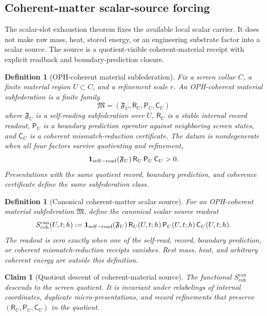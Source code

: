 \documentclass[11pt]{article}
\newtheorem{definition}[theorem]{Definition}
\newtheorem{claim}[theorem]{Claim}
\theoremstyle{remark}
\theoremstyle{plain}
\begin{document}
\subsection{Coherent-matter scalar-source forcing}
\label{sec:coherent-matter-scalar-source-forcing}

The scalar-slot exhaustion theorem fixes the available local scalar carrier.  It
does not make raw mass, heat, stored energy, or an engineering substrate factor
into a scalar source.  The source is a quotient-visible coherent-material receipt
with explicit readback and boundary-prediction closure.

\begin{definition}[OPH-coherent material subfederation]
\label{def:oph-coherent-material-subfederation}
Fix a screen collar \(C\), a finite material region \(U\subset C\), and a
refinement scale \(r\).  An OPH-coherent material subfederation is a finite
family
\[
  \mathfrak M=(\mathfrak F_U,\mathsf R_U,\mathsf P_U,\mathsf C_U)
\]
where \(\mathfrak F_U\) is a self-reading subfederation over \(U\),
\(\mathsf R_U\) is a stable internal record readout, \(\mathsf P_U\) is a
boundary prediction operator against neighboring screen states, and
\(\mathsf C_U\) is a coherent mismatch-reduction certificate.  The datum is
nondegenerate when all four factors survive quotienting and refinement,
\[
  \mathbf 1_{\rm self-read}(\mathfrak F_U)\,
  \mathsf R_U\,\mathsf P_U\,\mathsf C_U>0 .
\]
Presentations with the same quotient record, boundary prediction, and coherence
certificate define the same subfederation class.
\end{definition}

\begin{definition}[Canonical coherent-matter scalar source]
\label{def:canonical-coherent-matter-scalar-source}
For an OPH-coherent material subfederation \(\mathfrak M\), define the canonical
scalar source readout
\[
  S_{\mathrm{coh}}^{\mathrm{can}}(U,t;h)
  :=
  \mathbf 1_{\rm self-read}(\mathfrak F_U)\,
  \mathsf R_U(U,t;h)\,\mathsf P_U(U,t;h)\,\mathsf C_U(U,t;h) .
\]
The readout is zero exactly when one of the self-read, record, boundary
prediction, or coherent mismatch-reduction receipts vanishes.  Rest mass, heat,
and arbitrary coherent energy are outside this definition.
\end{definition}

\begin{claim}[Quotient descent of coherent-material source]
\label{lem:coherent-material-source-quotient-descent}
The functional \(S_{\mathrm{coh}}^{\mathrm{can}}\) descends to the screen quotient.
It is invariant under relabelings of internal coordinates, duplicate
micro-presentations, and record refinements that preserve
\((\mathsf R_U,\mathsf P_U,\mathsf C_U)\) in the quotient.
\end{claim}
\end{document}
